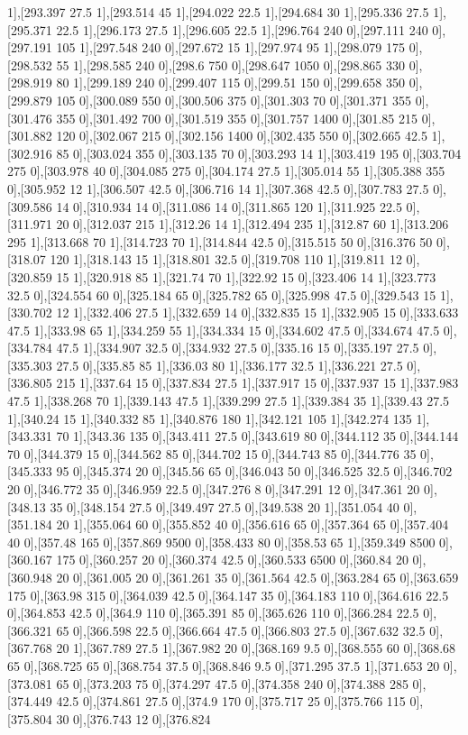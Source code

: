 {1],[293.397 27.5 1],[293.514 45 1],[294.022 22.5 1],[294.684 30 1],[295.336 27.5 1],[295.371 22.5 1],[296.173 27.5 1],[296.605 22.5 1],[296.764 240 0],[297.111 240 0],[297.191 105 1],[297.548 240 0],[297.672 15 1],[297.974 95 1],[298.079 175 0],[298.532 55 1],[298.585 240 0],[298.6 750 0],[298.647 1050 0],[298.865 330 0],[298.919 80 1],[299.189 240 0],[299.407 115 0],[299.51 150 0],[299.658 350 0],[299.879 105 0],[300.089 550 0],[300.506 375 0],[301.303 70 0],[301.371 355 0],[301.476 355 0],[301.492 700 0],[301.519 355 0],[301.757 1400 0],[301.85 215 0],[301.882 120 0],[302.067 215 0],[302.156 1400 0],[302.435 550 0],[302.665 42.5 1],[302.916 85 0],[303.024 355 0],[303.135 70 0],[303.293 14 1],[303.419 195 0],[303.704 275 0],[303.978 40 0],[304.085 275 0],[304.174 27.5 1],[305.014 55 1],[305.388 355 0],[305.952 12 1],[306.507 42.5 0],[306.716 14 1],[307.368 42.5 0],[307.783 27.5 0],[309.586 14 0],[310.934 14 0],[311.086 14 0],[311.865 120 1],[311.925 22.5 0],[311.971 20 0],[312.037 215 1],[312.26 14 1],[312.494 235 1],[312.87 60 1],[313.206 295 1],[313.668 70 1],[314.723 70 1],[314.844 42.5 0],[315.515 50 0],[316.376 50 0],[318.07 120 1],[318.143 15 1],[318.801 32.5 0],[319.708 110 1],[319.811 12 0],[320.859 15 1],[320.918 85 1],[321.74 70 1],[322.92 15 0],[323.406 14 1],[323.773 32.5 0],[324.554 60 0],[325.184 65 0],[325.782 65 0],[325.998 47.5 0],[329.543 15 1],[330.702 12 1],[332.406 27.5 1],[332.659 14 0],[332.835 15 1],[332.905 15 0],[333.633 47.5 1],[333.98 65 1],[334.259 55 1],[334.334 15 0],[334.602 47.5 0],[334.674 47.5 0],[334.784 47.5 1],[334.907 32.5 0],[334.932 27.5 0],[335.16 15 0],[335.197 27.5 0],[335.303 27.5 0],[335.85 85 1],[336.03 80 1],[336.177 32.5 1],[336.221 27.5 0],[336.805 215 1],[337.64 15 0],[337.834 27.5 1],[337.917 15 0],[337.937 15 1],[337.983 47.5 1],[338.268 70 1],[339.143 47.5 1],[339.299 27.5 1],[339.384 35 1],[339.43 27.5 1],[340.24 15 1],[340.332 85 1],[340.876 180 1],[342.121 105 1],[342.274 135 1],[343.331 70 1],[343.36 135 0],[343.411 27.5 0],[343.619 80 0],[344.112 35 0],[344.144 70 0],[344.379 15 0],[344.562 85 0],[344.702 15 0],[344.743 85 0],[344.776 35 0],[345.333 95 0],[345.374 20 0],[345.56 65 0],[346.043 50 0],[346.525 32.5 0],[346.702 20 0],[346.772 35 0],[346.959 22.5 0],[347.276 8 0],[347.291 12 0],[347.361 20 0],[348.13 35 0],[348.154 27.5 0],[349.497 27.5 0],[349.538 20 1],[351.054 40 0],[351.184 20 1],[355.064 60 0],[355.852 40 0],[356.616 65 0],[357.364 65 0],[357.404 40 0],[357.48 165 0],[357.869 9500 0],[358.433 80 0],[358.53 65 1],[359.349 8500 0],[360.167 175 0],[360.257 20 0],[360.374 42.5 0],[360.533 6500 0],[360.84 20 0],[360.948 20 0],[361.005 20 0],[361.261 35 0],[361.564 42.5 0],[363.284 65 0],[363.659 175 0],[363.98 315 0],[364.039 42.5 0],[364.147 35 0],[364.183 110 0],[364.616 22.5 0],[364.853 42.5 0],[364.9 110 0],[365.391 85 0],[365.626 110 0],[366.284 22.5 0],[366.321 65 0],[366.598 22.5 0],[366.664 47.5 0],[366.803 27.5 0],[367.632 32.5 0],[367.768 20 1],[367.789 27.5 1],[367.982 20 0],[368.169 9.5 0],[368.555 60 0],[368.68 65 0],[368.725 65 0],[368.754 37.5 0],[368.846 9.5 0],[371.295 37.5 1],[371.653 20 0],[373.081 65 0],[373.203 75 0],[374.297 47.5 0],[374.358 240 0],[374.388 285 0],[374.449 42.5 0],[374.861 27.5 0],[374.9 170 0],[375.717 25 0],[375.766 115 0],[375.804 30 0],[376.743 12 0],[376.824 }
